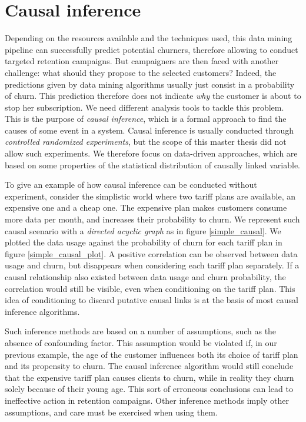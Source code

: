 \section{Causal inference}

Depending on the resources available and the techniques used, this data mining
pipeline can successfully predict potential churners, therefore allowing to
conduct targeted retention campaigns. But campaigners are then faced with
another challenge: what should they propose to the selected customers? Indeed,
the predictions given by data mining algorithms usually just consist in a
probability of churn. This prediction therefore does not indicate \emph{why} the
customer is about to stop her subscription. We need different analysis tools to
tackle this problem. This is the purpose of \emph{causal inference}, which is a
formal approach to find the causes of some event in a system. Causal inference
is usually conducted through \emph{controlled randomized experiments}, but the
scope of this master thesis did not allow such experiments. We therefore focus
on data-driven approaches, which are based on some properties of the statistical
distribution of causally linked variable.

To give an example of how causal inference can be conducted without experiment,
consider the simplistic world where two tariff plans are available, an expensive
one and a cheap one. The expensive plan makes customers consume more data per
month, and increases their probability to churn. We represent such causal
scenario with a \emph{directed acyclic graph} as in figure \ref{simple_causal}.
We plotted the data usage against the probability of churn for each tariff plan
in figure \ref{simple_causal_plot}. A positive correlation can be observed
between data usage and churn, but disappears when considering each tariff plan
separately. If a causal relationship also existed between data usage and churn
probability, the correlation would still be visible, even when conditioning on
the tariff plan. This idea of conditioning to discard putative causal links is
at the basis of most causal inference algorithms.

Such inference methods are based on a number of assumptions, such as the absence
of confounding factor. This assumption would be violated if, in our previous
example, the age of the customer influences both its choice of tariff plan and
its propensity  to churn. The causal inference algorithm would still conclude
that the expensive tariff plan causes clients to churn, while in reality they
churn solely because of their young age. This sort of erroneous conclusions can
lead to ineffective action in retention campaigns. Other inference methods imply
other assumptions, and care must be exercised when using them.

